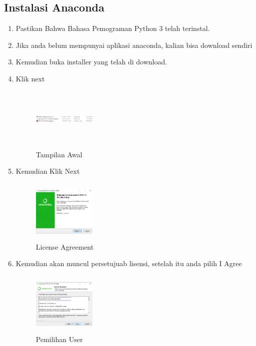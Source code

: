 \subsection{Instalasi Anaconda}
\begin{enumerate}
    \item Pastikan Bahwa Bahasa Pemograman Python 3 telah terinstal.
    \item Jika anda belum mempunyai aplikasi anaconda, kalian bisa download sendiri
    \item Kemudian buka installer yang telah di download.
    \item Klik next
    \begin{figure}[!htbp]
        \centering
        \includegraphics[width=3cm,height=3cm]{figures/gambar1.png}
        \caption{Tampilan Awal}
        \label{awal}
        \end{figure}

    \item Kemudian Klik Next
    \begin{figure}[!htbp]
        \centering
        \includegraphics[width=3cm,height=3cm]{figures/gambar2.png}
        \caption{License Agreement}
        \label{License}
        \end{figure}

    \item Kemudian akan muncul persetujuab lisensi, setelah itu anda pilih  I Agree
    \begin{figure}[!htbp]
        \centering
        \includegraphics[width=3cm,height=3cm]{figures/gambar3.png}
        \caption{Pemilihan User}
        \label{User}
        \end{figure}


\end{enumerate}
